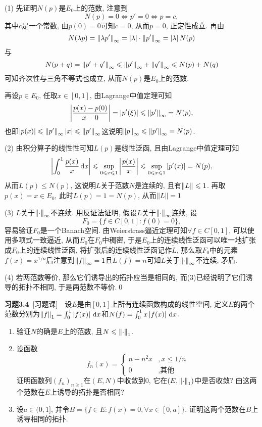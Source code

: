     \begin{Proof}
    (1) 先证明$ N(p) $是$ E_0 $上的范数, 注意到
    \[
    N(p)=0\Longleftrightarrow p'=0\Longleftrightarrow p=c,
    \]
    其中$ c $是一个常数, 由$ p(0)=0 $可知$ c=0 $, 从而$ p=0 $, 正定性成立. 再由
    \[
    N(\lambda p)=\left\| \lambda p' \right\|_\infty=\left| \lambda \right| \cdot\left\| p' \right\|_\infty=\left| \lambda \right| N(p)
    \]
    与
    \[
    N(p+q)=\left\| p'+q' \right\|_\infty\leqslant\left\| p' \right\|_\infty+\left\| q' \right\|_\infty\leqslant N(p)+N(q)
    \]
    可知齐次性与三角不等式也成立, 从而$ N(p) $是$ E_0 $上的范数.
    
    再设$ p\in E_0 $, 任取$ x\in[0,1] $, 由Lagrange中值定理可知
    \[
    \left| \frac{p(x)-p(0)}{x-0} \right| =\left| p'(\xi) \right| \leqslant\left\| p' \right\|_\infty=N(p),
    \]
    也即$ \left| p(x) \right| \leqslant \left\| p' \right\|_\infty\left| x \right| \leqslant \left\| p' \right\|_\infty $这说明$ \left\| p \right\|_\infty\leqslant\left\| p' \right\|_\infty=N(p) $.
    
    (2) 由积分算子的线性性可知$ L(p) $是线性泛函, 且由Lagrange中值定理可知
    \[
    \left| \int_0^1\frac{p(x)}{x}\,\mathrm{d} x \right| \leqslant\sup_{0\leqslant x\leqslant 1}\left| \frac{p(x)}{x} \right| \leqslant\sup_{0\leqslant x\leqslant 1}\left| p'(x) \right| =N(p),
    \]
    从而$ L(p)\leqslant N(p) $, 这说明$ L $关于范数$ N $是连续的, 且有$ \left\| L \right\|\leqslant 1 $. 再取$ p(x)=x\in E_0 $, 此时$ L(p)=1=N(p) $, 从而$ \left\| L \right\|=1 $
    
    (3) $ L $关于$ \left\| \cdot \right\|_\infty $不连续. 用反证法证明, 假设$ L $关于$ \left\| \cdot \right\|_\infty $连续, 设
    \[
     F_0=\{ f\in C[0,1] : f(0)=0 \},
    \]
    容易验证$ F_0 $是一个Banach空间. 由Weierstrass逼近定理可知$ \forall f\in C[0,1] $, 可以使用多项式一致逼近, 从而$ E_0 $在$ F_0 $中稠密, 于是$ E_0 $上的连续线性泛函可以唯一地扩张成$ F_0 $上的连续线性泛函, 将扩张后的连续线性泛函记作$ \tilde{L} $, 那么取$ F_0 $中的元素$ f(x)=x^{1/n} $后注意到$ \left\| f \right\|_\infty=1 $且$ \tilde{L}(f)=n $可知$ \tilde{L} $关于$ \left\| \cdot \right\|_\infty $不连续, 矛盾.
    
    (4) 若两范数等价, 那么它们诱导出的拓扑应当是相同的, 而(3)已经说明了它们诱导的拓扑不相同, 于是两范数不等价.\qed
    \end{Proof}
    
    \textbf{习题3.4}\ [习题课]\ \ 设$ E $是由$ [0,1] $上所有连续函数构成的线性空间, 定义$ E $的两个范数分别为$ \left\| f \right\|_1=\int_0^1\left| f(x) \right| \,\mathrm{d} x $和$ N(f)=\int_0^1x\left| f(x) \right| \,\mathrm{d} x $.
    \begin{enumerate}[(1)]
    \item 验证$ N $的确是$ E $上的范数, 且$ N\leqslant\left\| \cdot \right\|_1 $.
    \item 设函数
    \[
    f_n(x)=\begin{cases}
    n-n^2x & ,x\leqslant 1/n\\
    0 & ,\text{其他}
    \end{cases}
    \]
    证明函数列$ (f_n)_{n\geqslant 1} $在$ (E,N) $中收敛到0, 它在$ (E,\left\| \cdot \right\|_1) $中是否收敛? 由这两个范数在$ E $上诱导的拓扑是否相同?
    \item 设$ a\in(0,1] $, 并令$ B=\{ f\in E : f(x)=0, \forall x\in[0,a] \} $. 证明这两个范数在$ B $上诱导相同的拓扑.
    \end{enumerate}
    
